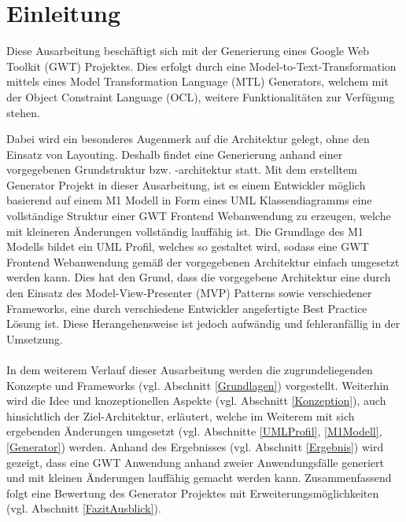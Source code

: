 \chapter{Einleitung}
\label{Einleitung}
Diese Ausarbeitung beschäftigt sich mit der Generierung eines Google Web
Toolkit (GWT) Projektes.
Dies erfolgt durch eine Model-to-Text-Transformation mittels eines Model
Transformation Language (MTL) Generators, welchem mit der Object Constraint Language (OCL), weitere
Funktionalitäten zur Verfügung stehen. 

Dabei wird ein besonderes Augenmerk auf die Architektur gelegt, ohne den
Einsatz von Layouting. Deshalb findet eine Generierung anhand einer vorgegebenen
Grundstruktur bzw. -architektur statt. Mit dem erstelltem Generator Projekt in
dieser Ausarbeitung, ist es einem Entwickler möglich basierend auf einem M1 Modell in Form eines UML
Klassendiagramms eine vollständige Struktur einer GWT Frontend Webanwendung zu
erzeugen, welche mit kleineren Änderungen vollständig lauffähig ist. Die
Grundlage des M1 Modells bildet ein UML Profil, welches so gestaltet wird,
sodass eine GWT Frontend Webanwendung gemäß der vorgegebenen Architektur einfach
umgesetzt werden kann. Dies hat den Grund, dass die vorgegebene Architektur eine
durch den Einsatz des Model-View-Presenter (MVP) Patterns sowie verschiedener
Frameworks, eine durch verschiedene Entwickler angefertigte \glqq{}Best
Practice\grqq{} Lösung ist. Diese Herangehensweise ist jedoch aufwändig und
fehleranfällig in der Umsetzung. 
\\\\
In dem weiterem Verlauf dieser Ausarbeitung werden die zugrundeliegenden
Konzepte und Frameworks (vgl. Abschnitt \ref{Grundlagen}) vorgestellt. Weiterhin
wird die Idee und knozeptionellen Aspekte (vgl. Abschnitt \ref{Konzeption}),
auch hinsichtlich der Ziel-Architektur, erläutert, welche im Weiterem mit sich
ergebenden Änderungen umgesetzt (vgl. Abschnitte \ref{UMLProfil},
\ref{M1Modell}, \ref{Generator}) werden.
Anhand des Ergebnisses (vgl. Abschnitt \ref{Ergebnis}) wird gezeigt, dass eine
GWT Anwendung anhand zweier Anwendungsfälle generiert und mit kleinen
Änderungen lauffähig gemacht werden kann. Zusammenfassend folgt eine Bewertung
des Generator Projektes mit Erweiterungsmöglichkeiten (vgl. Abschnitt
\ref{FazitAusblick}).
